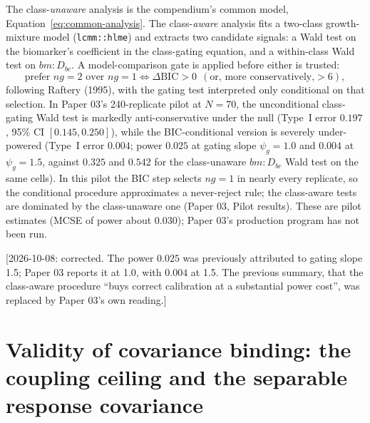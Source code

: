 \documentclass[11pt]{article}
\newcommand{\note}[1]{\textcolor{blue!60!black}{\small [#1]}}
\newcommand{\code}[1]{\texttt{#1}}
\begin{document}
The class-\emph{unaware} analysis is the compendium's common model,
Equation~\eqref{eq:common-analysis}. The class-\emph{aware} analysis
fits a two-class growth-mixture model (\code{lcmm::hlme}) and extracts
two candidate signals: a Wald test on the biomarker's coefficient in
the class-gating equation, and a within-class Wald test on
$bm{:}D_{bc}$. A model-comparison gate is applied before either is
trusted:
\begin{equation}
\text{prefer } ng=2 \text{ over } ng=1 \iff \Delta\mathrm{BIC} > 0
  \ \ (\text{or, more conservatively,} > 6),
\label{eq:bic-gate}
\end{equation}
following Raftery (1995), with the gating test interpreted only
conditional on that selection. In Paper 03's 240-replicate pilot at
$N=70$, the unconditional class-gating Wald test is markedly
anti-conservative under the null (Type~I error $0.197$, 95\% CI
$[0.145, 0.250]$), while the BIC-conditional version is
severely under-powered (Type~I error $0.004$; power $0.025$ at gating
slope $\psi_g = 1.0$ and $0.004$ at $\psi_g = 1.5$, against $0.325$ and
$0.542$ for the class-unaware $bm{:}D_{bc}$ Wald test on the same
cells). In this pilot the BIC step selects $ng=1$ in nearly every
replicate, so the conditional procedure approximates a never-reject
rule; the class-aware tests are dominated by the class-unaware one
(Paper 03, Pilot results). These are pilot estimates (MCSE of power
about 0.030); Paper 03's production program has not been run.

\note{2026-10-08: corrected. The power $0.025$ was previously attributed
to gating slope 1.5; Paper 03 reports it at 1.0, with $0.004$ at 1.5.
The previous summary, that the class-aware procedure ``buys correct
calibration at a substantial power cost'', was replaced by Paper 03's
own reading.}

\section{Validity of covariance binding: the coupling ceiling and the
separable response covariance}
\label{sec:ce}
\end{document}
